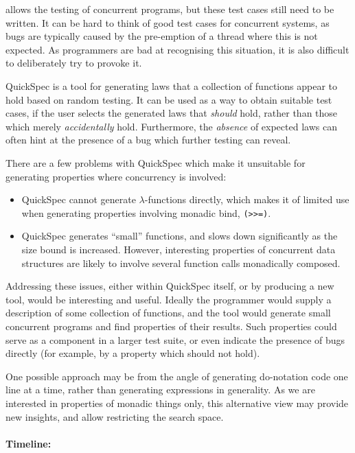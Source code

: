 \dejafu{} allows the testing of concurrent programs, but these test
cases still need to be written. It can be hard to think of good test
cases for concurrent systems, as bugs are typically caused by the
pre-emption of a thread where this is not expected. As programmers are
bad at recognising this situation, it is also difficult to
deliberately try to provoke it.

QuickSpec \citep{quickspec} is a tool for generating laws that a
collection of functions appear to hold based on random testing. It can
be used as a way to obtain suitable test cases, if the user selects
the generated laws that \emph{should} hold, rather than those which
merely \emph{accidentally} hold. Furthermore, the \emph{absence} of
expected laws can often hint at the presence of a bug which further
testing can reveal.

There are a few problems with QuickSpec which make it unsuitable for
generating properties where concurrency is involved:

\begin{itemize}
\item QuickSpec cannot generate $\lambda$-functions directly, which
  makes it of limited use when generating properties involving monadic
  bind, \verb|(>>=)|.

\item QuickSpec generates ``small'' functions, and slows down
  significantly as the size bound is increased. However, interesting
  properties of concurrent data structures are likely to involve
  several function calls monadically composed.
\end{itemize}

Addressing these issues, either within QuickSpec itself, or by
producing a new tool, would be interesting and useful. Ideally the
programmer would supply a description of some collection of functions,
and the tool would generate small concurrent programs and find
properties of their results. Such properties could serve as a
component in a larger test suite, or even indicate the presence of
bugs directly (for example, by a property which should not hold).

One possible approach may be from the angle of generating do-notation
code one line at a time, rather than generating expressions in
generality. As we are interested in properties of monadic things only,
this alternative view may provide new insights, and allow restricting
the search space.

\paragraph{Timeline:}

